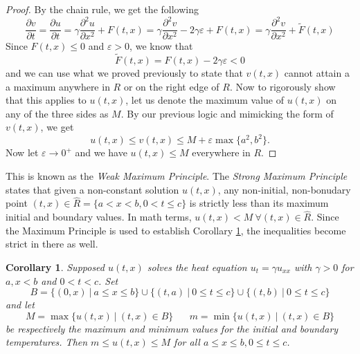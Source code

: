 \documentclass{article}
\newcommand{\pd}[2]{\frac{\partial #1}{\partial #2}}
\newcommand{\pdt}[2]{\frac{\partial ^2 #1}{\partial #2 ^2}}
\newtheorem{corollary}[theorem]{Corollary}
\numberwithin{equation}{section}
\begin{document}
\begin{proof}
    By the chain rule, we get the following 
    \begin{equation*}
        \pd{v}{t} = \pd{u}{t} =\gamma \pdt{u}{x}+F(t,x) = \gamma \pdt{v}{x} -2\gamma \varepsilon+F(t,x) = \gamma \pdt{v}{x} +\tilde{F}(t,x)
    \end{equation*}
    Since $F(t,x) \leq 0$ and $\varepsilon>0$, we know that 
    \begin{equation*}
        \tilde{F}(t,x) = F(t,x) -2\gamma\varepsilon <0
    \end{equation*}
    and we can use what we proved previously to state that $v(t,x)$ cannot attain a a maximum anywhere in $R$ or on the right edge of $R$. Now to rigorously show that this applies to $u(t,x)$, let us denote the maximum value of $u(t,x)$ on any of the three sides as $M$. By our previous logic and mimicking the form of $v(t,x)$, we get
    \begin{equation*}
    u(t,x) \leq v(t,x) \leq M+\varepsilon \max \{a^2,b^2 \}.
    \end{equation*}
    Now let $\varepsilon\rightarrow 0^+$ and we have $u(t,x) \leq M$ everywhere in $R$.
    
\end{proof}
This is known as the \textit{Weak Maximum Principle}. The \textit{Strong Maximum Principle} states that given a non-constant solution $u(t,x)$, any non-initial, non-bonudary point $(t,x) \in \hat{R} = \{a<x<b, 0<t\leq c\}$ is strictly less than its maximum initial and boundary values. In math terms, $u(t,x)<M \ \forall(t,x)\in \hat{R}$. Since the Maximum Principle is used to establish Corollary \ref{coro:mM}, the inequalities become strict in there as well. 
\begin{corollary}
    Supposed $u(t,x)$ solves the heat equation $u_t = \gamma u_{xx}$ with $\gamma > 0$ for $a,x<b$ and $0<t<c$. Set 
    \begin{equation*}
        B=\{(0,x) \ | \ a\leq x \leq b\} \cup \{(t,a)\ | \ 0\leq t \leq c\} \cup \{(t,b)\ | \ 0 \leq t \leq c\}
    \end{equation*}
    and let 
    \begin{equation*}
        M = \max \{u(t,x) \ | \ (t,x) \in B\} \hspace{20pt} m=\min \{u(t,x) \ | \ (t,x) \in B \}
    \end{equation*}
    be respectively the maximum and minimum values for the initial and boundary temperatures. Then $m \leq u(t,x) \leq M$ for all $a \leq x \leq b, 0 \leq t \leq c$.\label{coro:mM}
\end{corollary}
\end{document}
